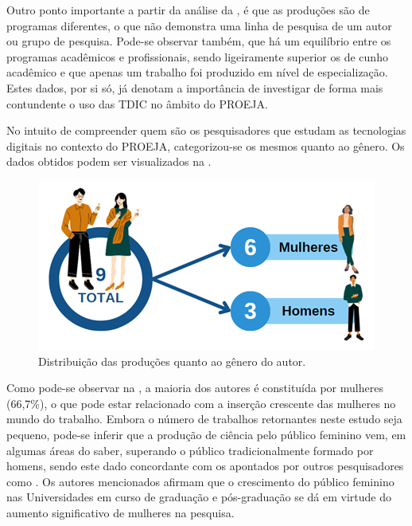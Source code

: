 Outro ponto importante a partir da análise da , é que as
produções são de programas diferentes, o que não demonstra uma linha de
pesquisa de um autor ou grupo de pesquisa. Pode-se observar também, que
há um equilíbrio entre os programas acadêmicos e profissionais, sendo
ligeiramente superior os de cunho acadêmico e que apenas um trabalho foi
produzido em nível de especialização. Estes dados, por si só, já denotam
a importância de investigar de forma mais contundente o uso das TDIC no
âmbito do PROEJA.

No intuito de compreender quem são os pesquisadores que estudam as
tecnologias digitais no contexto do PROEJA, categorizou-se os mesmos
quanto ao gênero. Os dados obtidos podem ser visualizados na .

\begin{figure}[!htpb]
\centering
\begin{minipage}{.5\textwidth}
\caption{Distribuição das produções quanto ao gênero do autor.}\label{fig4}
\includegraphics[width=\textwidth]{Fig4.png}
\end{minipage}
\end{figure}

Como pode-se observar na , a maioria dos autores é constituída
por mulheres (66,7\%), o que pode estar relacionado com a inserção
crescente das mulheres no mundo do trabalho. Embora o número de
trabalhos retornantes neste estudo seja pequeno, pode-se inferir que a
produção de ciência pelo público feminino vem, em algumas áreas do
saber, superando o público tradicionalmente formado por homens, sendo
este dado concordante com os apontados por outros pesquisadores como
\textcite{velho2003,Leta2003,Grossi2016}. Os
autores mencionados afirmam que o crescimento do público feminino nas
Universidades em curso de graduação e pós-graduação se dá em virtude do
aumento significativo de mulheres na pesquisa.

